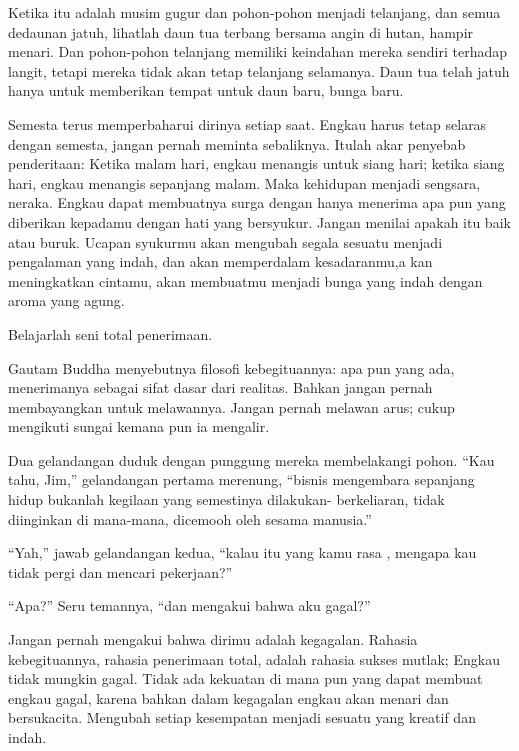 Ketika itu adalah musim gugur dan pohon-pohon menjadi telanjang, dan semua dedaunan jatuh, lihatlah daun tua terbang
bersama angin di hutan, hampir menari. Dan pohon-pohon telanjang memiliki keindahan mereka sendiri terhadap langit, tetapi mereka tidak akan tetap
telanjang selamanya. Daun tua telah jatuh hanya untuk memberikan tempat untuk daun baru, bunga baru.

Semesta terus memperbaharui dirinya setiap saat. Engkau harus tetap selaras dengan semesta, jangan pernah meminta sebaliknya. Itulah akar
penyebab penderitaan: Ketika malam hari, engkau menangis untuk siang hari; ketika siang hari, engkau menangis sepanjang malam. Maka
kehidupan menjadi sengsara, neraka. Engkau dapat membuatnya surga dengan hanya menerima apa pun yang diberikan kepadamu
dengan hati yang bersyukur. Jangan menilai apakah itu baik atau buruk. Ucapan syukurmu akan mengubah segala sesuatu menjadi
pengalaman yang indah, dan akan memperdalam kesadaranmu,a kan meningkatkan cintamu, akan membuatmu menjadi
bunga yang indah dengan aroma yang agung.

Belajarlah seni total penerimaan.

Gautam Buddha menyebutnya filosofi kebegituannya: apa pun yang ada, menerimanya sebagai sifat dasar dari realitas. Bahkan jangan pernah
membayangkan untuk melawannya. Jangan pernah melawan arus; cukup mengikuti sungai kemana pun ia mengalir.

Dua gelandangan duduk dengan punggung mereka membelakangi pohon. “Kau tahu, Jim,” gelandangan pertama merenung, “bisnis mengembara
sepanjang hidup bukanlah kegilaan yang semestinya dilakukan- berkeliaran, tidak diinginkan di mana-mana, dicemooh oleh sesama manusia.”

“Yah,” jawab gelandangan kedua, “kalau itu yang kamu rasa , mengapa kau tidak pergi dan mencari pekerjaan?”

“Apa?” Seru temannya, “dan mengakui bahwa aku gagal?”

Jangan pernah mengakui bahwa dirimu adalah kegagalan. Rahasia kebegituannya, rahasia penerimaan total,  adalah rahasia sukses mutlak; Engkau
tidak mungkin gagal. Tidak ada kekuatan di mana pun yang dapat membuat engkau gagal, karena bahkan dalam kegagalan engkau akan menari
dan bersukacita. Mengubah setiap kesempatan menjadi sesuatu yang kreatif dan indah.

